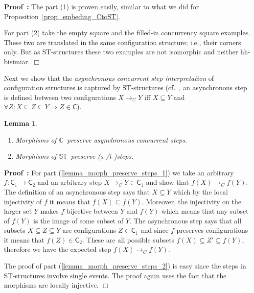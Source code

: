 \documentclass[submission,copyright,creativecommons]{eptcs}
\newtheorem{lemma}[theorem]{Lemma}
\newenvironment{proof}[1][\!\!\,]{\vspace{1ex}\noindent\textbf{Proof #1: }}{\hfill$\Box$\vspace{2ex}}
\newcommand{\refeq}[1]{(\ref{#1})}
\newcommand\C{\ensuremath{\mathsf{C}}}
\newcommand\allC{\ensuremath{\mathbb{C}}}
\newcommand\allST{\ensuremath{\mathbb{ST}}}
\newcommand\stepTransConfGlabbeek{\ensuremath{\rightarrow_{C}}}
\begin{document}
\begin{proof}
The part (1) is proven easily, similar to what we did for Proposition~\ref{prop_embeding_CtoST}.

For part (2) take the empty square and the filled-in concurrency square examples. These two are translated in the same configuration structure; i.e., their corners only. But as ST-structures these two examples are not isomorphic and neither hh-bisimiar.
\end{proof}



Next we show that the \textit{asynchronous concurrent step interpretation} of configuration structures is captured by ST-structures (cf.~\cite[Def.2.1]{GlabbeekP09configStruct}, an asynchronous step is defined between two configurations $X\stepTransConfGlabbeek Y$ iff $X\!\subseteq\!Y$ and $\forall Z:X\!\subseteq\!Z\subseteq\!Y \Rightarrow Z\!\in\!\C$).

\begin{lemma}\label{lemma_morph_preserve_steps}
\ 

\begin{enumerate}
\item\label{lemma_morph_preserve_steps_1} Morphisms of \allC\ preserve asynchronous concurrent steps. 

\item\label{lemma_morph_preserve_steps_2} Morphisms of \allST\ preserve (s-/t-)steps.
\end{enumerate}
\end{lemma}

\begin{proof}
For part \refeq{lemma_morph_preserve_steps_1} we take an arbitrary $f:\C_{1}\rightarrow\C_{2}$ and an arbitrary step $X\stepTransConfGlabbeek Y \in\C_{1}$ and show that $f(X)\stepTransConfGlabbeek f(Y)$. The definition of an asynchronous step says that $X\subseteq Y$ which by the local injectivity of $f$ it means that $f(X)\subseteq f(Y)$. Moreover, the injectivity on the larger set $Y$ makes $f$ bijective between $Y$ and $f(Y)$ which means that any subset of $f(Y)$ is the image of some subset of $Y$. The asynchronous step says that all subsets $X\subseteq Z\subseteq Y$ are configurations $Z\in\C_{1}$ and since $f$ preserves configurations it means that $f(Z)\in\C_{2}$. These are all possible subsets $f(X)\subseteq Z'\subseteq f(Y)$, therefore we have the expected step $f(X)\stepTransConfGlabbeek f(Y)$.

The proof of part \refeq{lemma_morph_preserve_steps_2} is easy since the steps in ST-structures involve single events. The proof again uses the fact that the morphisms are locally injective.
\end{proof}
\end{document}
